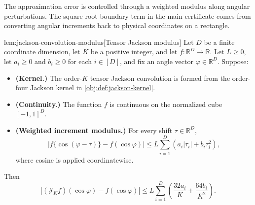\documentclass[11pt]{article}
\begin{document}
The approximation error is controlled through a weighted modulus along angular perturbations. The square-root boundary term in the main certificate comes from converting angular increments back to physical coordinates on a rectangle.

\begin{lemmav}{lem:jackson-convolution-modulus}[Tensor Jackson modulus]
Let \(D\) be a finite coordinate dimension, let \(K\) be a positive integer, and let \(f:\mathbb R^D\to\mathbb R\). Let \(L\ge0\), let \(a_i\ge0\) and \(b_i\ge0\) for each \(i\in[D]\), and fix an angle vector \(\varphi\in\mathbb R^D\). Suppose:
\begin{itemize}
\item \textbf{(Kernel.)} The order-\(K\) tensor Jackson convolution is formed from the order-four Jackson kernel in \cref{obj:def:jackson-kernel}.
\item \textbf{(Continuity.)} The function \(f\) is continuous on the normalized cube \([-1,1]^D\).
\item \textbf{(Weighted increment modulus.)} For every shift \(\tau\in\mathbb R^D\),
\[
\left|f\{\cos(\varphi-\tau)\}-f(\cos\varphi)\right|
\le
L\sum_{i=1}^D\left(a_i|\tau_i|+b_i\tau_i^2\right),
\]
where cosine is applied coordinatewise.
\end{itemize}
Then
\[
\left|(\mathcal J_K f)(\cos\varphi)-f(\cos\varphi)\right|
\le
L\sum_{i=1}^D\left(\frac{32a_i}{K}+\frac{64b_i}{K^2}\right).
\]
\end{lemmav}
\end{document}

